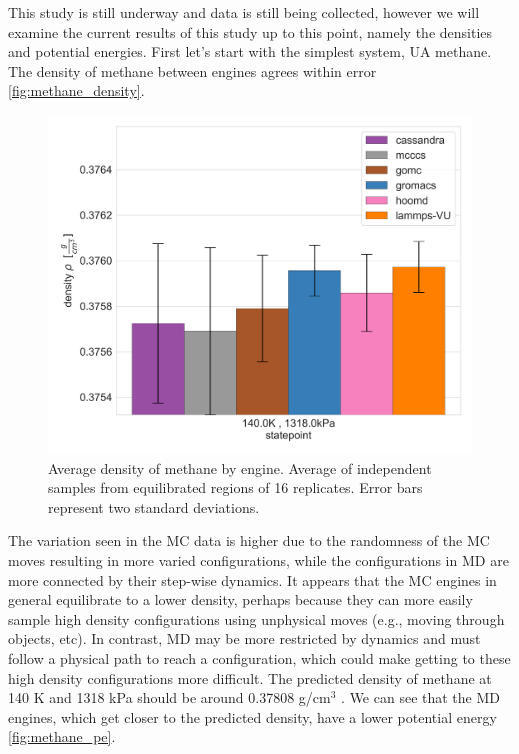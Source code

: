This study is still underway and data is still being collected, however we will examine the current results of this study up to this point, namely the densities and potential energies.
First let's start with the simplest system, UA methane.
The density of methane between engines agrees within error \autoref{fig:methane_density}.
\begin{figure}[h!]
    \centering
    \includegraphics[width=0.8\linewidth,keepaspectratio]{figures/rep_study/methaneUA_summary.png}
    \caption{Average density of methane by engine. Average of independent samples from equilibrated regions of 16 replicates. Error bars represent two standard deviations.}\label{fig:methane_density}
\end{figure}
The variation seen in the MC data is higher due to the randomness of the MC moves resulting in more varied configurations, while the configurations in MD are more connected by their step-wise dynamics. 
It appears that the MC engines in general equilibrate to a lower density, perhaps because they can more easily sample high density configurations using unphysical moves (e.g., moving through objects, etc).
In contrast, MD may be more restricted by dynamics and must follow a physical path to reach a configuration, which could make getting to these high density configurations more difficult.
The predicted density of methane at 140 K and 1318 kPa should be around 0.37808 g/cm$^3$ \cite{NISTwebbook}.
We can see that the MD engines, which get closer to the predicted density, have a lower potential energy \autoref{fig:methane_pe}.

